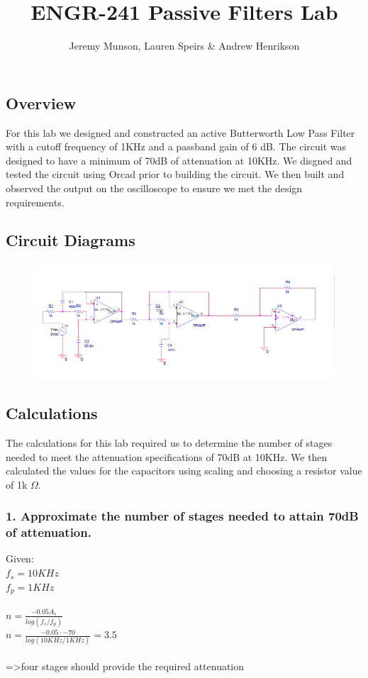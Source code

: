 \documentclass[11pt]{article}
\title{ENGR-241 Passive Filters Lab}
\author{Jeremy Munson, Lauren Speirs \& Andrew Henrikson}
\begin{document}
	\maketitle
	\subsection*{Overview}
	For this lab we designed and  constructed an active Butterworth Low Pass Filter with a cutoff frequency of 1KHz and a passband gain of 6 dB. The circuit was designed to have a minimum of 70dB of attenuation at 10KHz. We disgned and tested the circuit using Orcad prior to building the circuit. We then built and observed the output on the oscilloscope to ensure we met the design requirements.
	\subsection*{Circuit Diagrams}
		\begin{figure}[H]
		\centering
		\includegraphics[width=5.5in]{images/diagram.PNG}
	\end{figure}
	\subsection*{Calculations}
	The calculations for this lab required us to determine the number of stages needed to meet the attenuation specifications of 70dB at 10KHz. We then calculated the values for the capacitors using scaling and choosing a resistor value of 1k $\Omega$.
	\subsubsection*{1. Approximate the number of stages needed to attain 70dB of attenuation.}
	Given:\\
	$f_{s}=10KHz$\\
	$f_{p}=1KHz$\\\\
	$n=\frac{-0.05A_{s}}{log(f_{s}/f_{p})}$\\
	$n=\frac{-0.05\cdot -70}{log(10KHz/1KHz)}=3.5$\\\\
	=>four stages should provide the required attenuation
\end{document}
